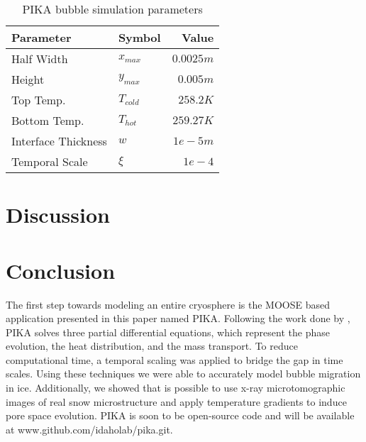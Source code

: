 \documentclass[twoside]{article}
\begin{document}
\begin{multicols}{2}
\begin{table}[H] 
\caption{PIKA bubble simulation parameters}
\label{table:bubble_stats}
\centering
\begin{tabular}{llr}
\toprule
Parameter & Symbol & Value \\
\midrule
Half Width & $x_{max}$ & $0.0025 m$ \\
Height & $y_{max}$ & $0.005 m$ \\
Top Temp. & $T_{cold}$ & $258.2 K$ \\
Bottom Temp. & $T_{hot}$ & $259.27 K$ \\
Interface Thickness & $w$ & $1e-5 m$ \\
Temporal Scale & $\xi$ & $1e-4$ \\
\bottomrule
\end{tabular}
\end{table}


\section{Discussion}

\section{Conclusion}
The first step towards modeling an entire cryosphere is the MOOSE based application presented in this paper named PIKA. Following the work done by \cite{Plapp_2009}, PIKA solves three partial differential equations, which represent the phase evolution, the heat distribution, and the mass transport. To reduce computational time, a temporal scaling was applied to bridge the gap in time scales. Using these techniques we were able to accurately model bubble migration in ice. Additionally, we showed that is possible to use x-ray microtomographic images of real snow microstructure and apply temperature gradients to induce pore space evolution. PIKA is soon to be open-source code and will be available at www.github.com/idaholab/pika.git.    

\begin{thebibliography}{50} %



\end{thebibliography}
\end{multicols}
\end{document}
